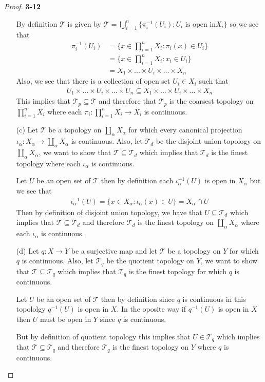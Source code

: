 \documentclass[11pt]{article}
\newcommand{\Topo}{\mathcal{T}}
\theoremstyle{definition}
\begin{document}
\begin{proof}{\textbf{3-12}}
\begin{itemize}
    By definition $\Topo$ is given by
    $\Topo = \bigcup_{i=1}^n \{\pi_i^{-1}(U_i) : U_i \text{ is open in} X_i\}$
    so we see that
    \begin{align*}
        \pi_i^{-1}(U_i) &= \{x \in \prod_{i=1}^n X_i : \pi_i(x) \in U_i\}\\
        &= \{x \in \prod_{i=1}^n X_i : x_i \in U_i\}\\
        &= X_1 \times ... \times U_i \times ... \times X_n
    \end{align*}
    Also, we see that there is a collection of open set $U_i \in X_i$ such that
    \begin{align*}
        U_1 \times ...\times U_i \times ... \times U_n
        \subseteq X_1 \times ... \times U_i \times ... \times X_n
    \end{align*}
    This implies that $\Topo_p \subseteq \Topo$ and therefore that $\Topo_p$
    is the coarsest topology on $\prod_{i=1}^n X_i$ where each
    $\pi_i: \prod_{i=1}^n X_i \to X_i$ is continuous. 
\cleardoublepage
    \item [(c)] Let $\Topo$ be a topology on $\coprod_{\alpha} X_\alpha$
    for which every canonical projection
    $\iota_\alpha: X_\alpha \to \coprod_{\alpha} X_\alpha$ is continuous.
    Also, let $\Topo_d$ be the disjoint union topology on
    $\coprod_{\alpha} X_\alpha$, we want to show that $\Topo \subseteq \Topo_d$
    which implies that $\Topo_d$ is the finest topology where each $\iota_\alpha$
    is continuous.

    Let $U$ be an open set of $\Topo$ then by definition each
    $\iota_\alpha^{-1}(U)$ is open in $X_\alpha$ but we see that
    \begin{align*}
        \iota_\alpha^{-1}(U) = \{x \in X_\alpha : \iota_\alpha(x) \in U \}
        = X_\alpha \cap U
    \end{align*}
    Then by definition of disjoint union topology, we have that 
    $U \subseteq \Topo_d$ which implies that $\Topo \subseteq \Topo_d$
    and therefore $\Topo_d$ is the finest topology on
    $\coprod_{\alpha} X_\alpha$ where each $\iota_\alpha$ is continuous.

    \item [(d)] Let $q: X \to Y$ be a surjective map and let $\Topo$ be a
    topology on $Y$ for which $q$ is continuous. Also, let $\Topo_q$ be the 
    quotient topology on $Y$, we want to show that $\Topo \subseteq \Topo_q$
    which implies that $\Topo_q$ is the finest topology for which $q$
    is continuous.

    Let $U$ be an open set of $\Topo$ then by definition since $q$ is
    continuous in this topololgy $q^{-1}(U)$ is open in $X$.
    In the oposite way if $q^{-1}(U)$ is open in $X$
    then $U$ must be open in $Y$ since $q$ is continuous.

    But by definition of quotient topology this implies that $U \in \Topo_q$
    which implies that $\Topo \subseteq \Topo_q$ and therefore $\Topo_q$
    is the finest topology on $Y$ where $q$ is continuous.
\end{itemize}
\end{proof}
\end{document}
